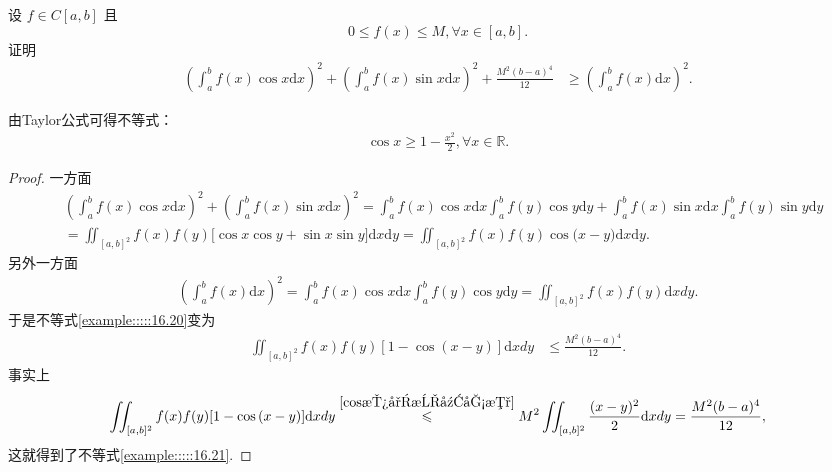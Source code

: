 \documentclass[../../main.tex]{subfiles}
\begin{document}
\begin{example}
设 $f \in C[a,b]$ 且
\[0 \leqslant f(x) \leqslant M, \forall x \in [a,b].\]
证明
\begin{align}\label{example:::::16.20}
\left(\int_{a}^{b}f(x)\cos x\mathrm{d}x\right)^2 + \left(\int_{a}^{b}f(x)\sin x\mathrm{d}x\right)^2 + \frac{M^2(b - a)^4}{12} &\geqslant \left(\int_{a}^{b}f(x)\mathrm{d}x\right)^2.
\end{align}
\end{example}
\begin{remark}
由Taylor公式可得不等式：
\begin{align}\label{cos放小成幂函数}
\cos x\geq 1-\frac{x^2}{2},\forall x\in \mathbb{R}.
\end{align}
\end{remark}
\begin{proof}
一方面
\begin{align*}
&\left( \int_a^b{f(x)\cos x\mathrm{d}x} \right) ^2+\left( \int_a^b{f(x)\sin x\mathrm{d}x} \right) ^2=\int_a^b{f(x)\cos x\mathrm{d}x}\int_a^b{f(y)\cos y\mathrm{d}y}+\int_a^b{f(x)\sin x\mathrm{d}x}\int_a^b{f(y)\sin y\mathrm{d}y}
\\
&=\iint_{[a,b]^2}{f(x)f(y)[\cos x\cos y}+\sin x\sin y]\mathrm{d}x\mathrm{d}y=\iint_{[a,b]^2}{f(x)f(y)\cos\mathrm{(}x}-y)\mathrm{d}x\mathrm{d}y.
\end{align*}
另外一方面
\begin{align*}
\left( \int_a^b{f(x)\mathrm{d}x} \right) ^2=\int_a^b{f(x)\cos x\mathrm{d}x}\int_a^b{f(y)\cos y\mathrm{d}y}=\iint_{[a,b]^2}{f(x)f(y)\mathrm{d}xdy.}
\end{align*}
于是不等式\eqref{example:::::16.20}变为
\begin{align}\label{example:::::16.21}
\iint_{[a,b]^2}f(x)f(y)[1 - \cos(x - y)]\mathrm{d}xdy &\leqslant \frac{M^2(b - a)^4}{12}.
\end{align}
事实上
\begin{align*}
\iint_{[a,b]^2}{f(x)f(y)[1}-\cos\mathrm{(}x-y)]\mathrm{d}xdy\overset{\eqref{cos放小成幂函数}}{\leqslant}M^2\iint_{[a,b]^2}{\frac{(x-y)^2}{2}\mathrm{d}xdy}=\frac{M^2(b-a)^4}{12},
\end{align*}
这就得到了不等式\eqref{example:::::16.21}. 
\end{proof}
\end{document}
